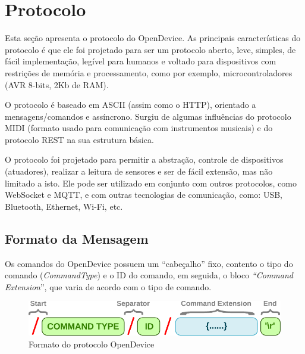 
\section{Protocolo\label{subsec:Protocolo}}

Esta seção apresenta o protocolo do OpenDevice. As principais características
do protocolo é que ele foi projetado para ser um protocolo aberto,
leve, simples, de fácil implementação, legível para humanos e voltado
para dispositivos com restrições de memória e processamento, como
por exemplo, microcontroladores (AVR 8-bits, 2Kb de RAM).

O protocolo é baseado em ASCII (assim como o HTTP), orientado a mensagens/comandos
e assíncrono. Surgiu de algumas influências do protocolo MIDI (formato
usado para comunicação com instrumentos musicais) e do protocolo REST
na sua estrutura básica. 

O protocolo foi projetado para permitir a abstração, controle de dispositivos
(atuadores), realizar a leitura de sensores e ser de fácil extensão,
mas não limitado a isto. Ele pode ser utilizado em conjunto com outros
protocolos, como WebSocket e MQTT, e com outras tecnologias de comunicação,
como: USB, Bluetooth, Ethernet, Wi-Fi, etc. 


\subsection{Formato da Mensagem}

Os comandos do OpenDevice possuem um ``cabeçalho'' fixo, contento
o tipo do comando (\emph{CommandType}) e o ID do comando, em seguida,
o bloco \emph{``Command Extension}'', que varia de acordo com o
tipo de comando. 

\begin{figure}[H]
\begin{centering}
\includegraphics[width=0.8\linewidth]{Imagens/Cap_4/protocol_spec}
\par\end{centering}
\caption{Formato do protocolo OpenDevice \label{fig:protocol_spec}}
\end{figure}

